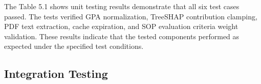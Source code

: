 The Table 5.1 shows  unit testing results demonstrate that all six test cases passed.
The tests verified GPA normalization, TreeSHAP contribution clamping,
PDF text extraction, cache expiration, and SOP evaluation criteria
weight validation. These results indicate that the tested components
performed as expected under the specified test conditions.

\endgroup


\clearpage
\subsection{Integration Testing}

\begingroup
\small
\setlength{\tabcolsep}{3pt}
\renewcommand{\arraystretch}{1.35}



